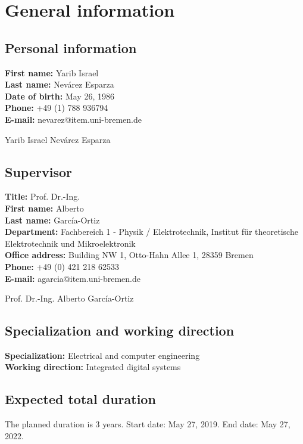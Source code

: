 \section{General information}
\subsection{Personal information}
\textbf{First name:} Yarib Israel\\
\textbf{Last name:} Nev\'arez Esparza\\
\textbf{Date of birth:} May 26, 1986\\
\textbf{Phone:} +49 (1) 788 936794\\
\textbf{E-mail:} nevarez@item.uni-bremen.de\\


\colorbox{signaturegray}{\makebox[0.4\textwidth]{\raisebox{-15mm}{\rule{7cm}{0.1pt}}}}
		
Yarib Israel Nev\'arez Esparza
	

\subsection{Supervisor}

\textbf{Title:} Prof. Dr.-Ing.\\
\textbf{First name:} Alberto\\
\textbf{Last name:} Garc\'ia-Ortiz\\
\textbf{Department:} Fachbereich 1 - Physik / Elektrotechnik,
Institut f\"ur theoretische Elektrotechnik und Mikroelektronik\\
\textbf{Office address:} Building NW 1, Otto-Hahn Allee 1, 28359 Bremen\\
\textbf{Phone:} +49 (0) 421 218 62533\\
\textbf{E-mail:} agarcia@item.uni-bremen.de\\


\colorbox{signaturegray}{\makebox[0.4\textwidth]{\raisebox{-15mm}{\rule{7cm}{0.1pt}}}}

Prof. Dr.-Ing. Alberto Garc\'ia-Ortiz

\subsection{Specialization and working direction}
\textbf{Specialization:} Electrical and computer engineering\\
\textbf{Working direction:} Integrated digital systems

\subsection{Expected total duration}
The planned duration is 3 years. Start date: May 27, 2019. End date: May 27, 2022.

\pagebreak